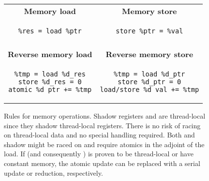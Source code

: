 
\begin{figure}
    \centering
     \begin{tabular}{c|c}
\textbf{Memory load}&\textbf{Memory store}\\
\begin{minipage}[T]{0.45\linewidth}
\begin{verbatim}
%res = load %ptr
\end{verbatim}
\end{minipage}& \begin{minipage}[T]{0.45\linewidth}
\begin{verbatim}
store %ptr = %val
\end{verbatim}
\end{minipage}\\\\
\textbf{Reverse memory load}&\textbf{Reverse memory store}\\
\begin{minipage}[T]{0.45\linewidth}
\begin{verbatim}
%tmp = load %d_res
store %d_res = 0
atomic %d_ptr += %tmp
\end{verbatim}
\end{minipage}&
\begin{minipage}[T]{0.45\linewidth}
\begin{verbatim}
%tmp = load %d_ptr
store %d_ptr = 0
load/store %d_val += %tmp
\end{verbatim}
\end{minipage}
\end{tabular}
    \vspace*{-2mm}
    \caption{Rules for memory operations. Shadow registers  and  are thread-local since they shadow thread-local registers. There is no risk of racing on thread-local data and no special handling required. Both  and shadow  might be raced on and require atomics in the adjoint of the load. If  (and consequently ) is proven to be thread-local or have constant memory, the atomic update can be replaced with a serial update or reduction, respectively.}
    \label{fig:memory_ops}
    \vspace*{-2mm}
\end{figure}

